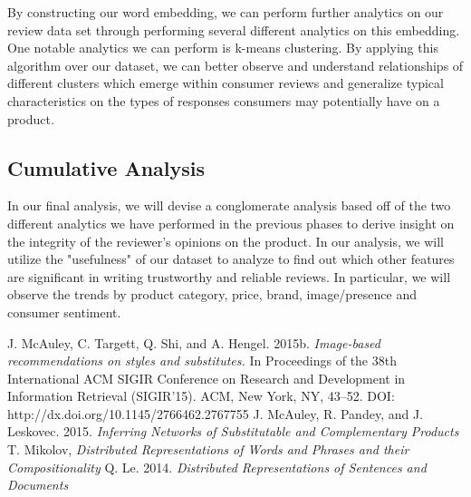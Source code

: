 \documentclass[a4paper, 11pt]{article}
\begin{document}
By constructing our word embedding, we can perform further analytics on our review data set through performing several different analytics on this embedding. One notable analytics we can perform is k-means clustering. By applying this algorithm over our dataset, we can better observe and understand relationships of different clusters which emerge within consumer reviews and generalize typical characteristics on the types of responses consumers may potentially have on a product.

\subsection{Cumulative Analysis}
In our final analysis, we will devise a conglomerate analysis based off of the two different analytics we have performed in the previous phases to derive insight on the integrity of the reviewer's opinions on the product. In our analysis, we will utilize the "usefulness" of our dataset to analyze to find out which other features are significant in writing trustworthy and reliable reviews. In particular, we will observe the trends by product category, price, brand, image/presence and consumer sentiment. 

\begin{thebibliography}{9}
 J. McAuley, C. Targett, Q. Shi, and A. Hengel. 2015b. \emph{Image-based recommendations on styles and substitutes.} In Proceedings of the 38th International ACM SIGIR Conference on Research and Development in Information Retrieval (SIGIR’15). ACM, New York, NY, 43–52. DOI: http://dx.doi.org/10.1145/2766462.2767755
 J. McAuley, R. Pandey, and J. Leskovec. 2015. \emph{Inferring Networks of Substitutable and Complementary Products}
 T. Mikolov, \emph{Distributed Representations of Words and Phrases and their Compositionality}
 Q. Le. 2014. \emph{Distributed Representations of Sentences and Documents}

\end{thebibliography}
\end{document}

